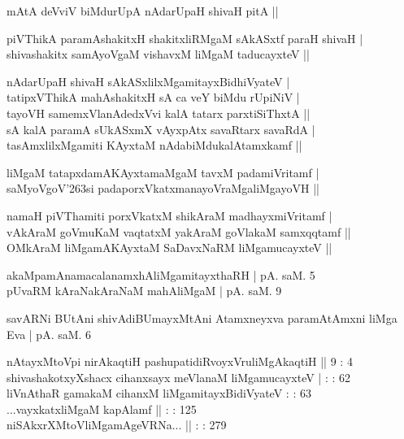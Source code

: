 \begin{entry}
\begin{shl}
mAtA deVviV biMdurUpA nAdarUpaH shivaH pitA ||
\end{shl}
\begin{shl}
piVThikA paramAshakitxH shakitxliRMgaM sAkASxtf paraH shivaH |\\
shivashakitx samAyoVgaM vishavxM liMgaM taducayxteV ||
\end{shl}
\begin{shl}
nAdarUpaH shivaH sAkASxlilxMgamitayxBidhiVyateV |\\
tatipxVThikA mahAshakitxH sA ca veY biMdu rUpiNiV |\\
tayoVH samemxVlanAdedxVvi kalA tatarx parxtiSiThxtA ||\\
sA kalA paramA sUkASxmX vAyxpAtx savaRtarx savaRdA |\\
tasAmxlilxMgamiti KAyxtaM nAdabiMdukalAtamxkamf ||
\end{shl}
\begin{shl}
liMgaM tatapxdamAKAyxtamaMgaM tavxM padamiVritamf |\\
saMyoVgoV{\char'263}si padaporxVkatxmanayoVraMgaliMgayoVH ||
\end{shl}
\begin{shl}
namaH piVThamiti porxVkatxM shikAraM madhayxmiVritamf |\\
vAkAraM goVmuKaM vaqtatxM yakAraM goVlakaM samxqqtamf ||\\
OMkAraM liMgamAKAyxtaM SaDavxNaRM liMgamucayxteV ||
\end{shl}
\gl{}
\begin{shl}
akaMpamAnamacalanamxhAliMgamitayxthaRH | pA. saM. 5\\
pUvaRM kAraNakAraNaM mahAliMgaM | pA. saM. 9
\end{shl}
\gl{}
\begin{shl}
savARNi BUtAni shivAdiBUmayxMtAni Atamxneyxva paramAtAmxni liMga Eva | pA. saM. 6
\end{shl}
\gl{}
\info{}{}{}{}
\begin{shl}
nAtayxMtoVpi nirAkaqtiH pashupatidiRvoyxVruliMgAkaqtiH || 9 : 4\\
shivashakotxyXshacx cihanxsayx meVlanaM liMgamucayxteV | : : 62\\
liVnAthaR gamakaM cihanxM liMgamitayxBidiVyateV : : 63\\
...vayxkatxliMgaM kapAlamf || : : 125\\
niSAkxrXMtoVliMgamAgeVRNa... || : : 279
\end{shl}
\gl{}
\info{}{}{}{}


\end{entry}
